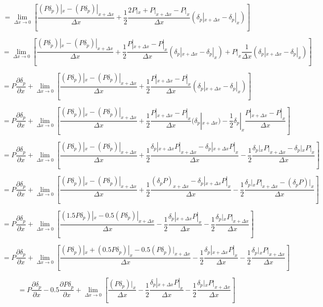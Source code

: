 \documentclass[11pt]{article}
\begin{document}
$$=\lim_{\Delta x \rightarrow 0} [\frac{(P \delta_p )|_x -  (P \delta_p )|_{x+\Delta x}}{\Delta x}  + \frac{1}{2} \frac{2P|_x + P|_{x+\Delta x} - P|_x}{\Delta x} (\delta_p|_{x+\Delta x} - \delta_p|_{x})] $$

$$=\lim_{\Delta x \rightarrow 0} [\frac{(P \delta_p )|_x -  (P \delta_p )|_{x+\Delta x}}{\Delta x}  + \frac{1}{2} \frac{ P|_{x+\Delta x} - P|_x}{\Delta x} (\delta_p|_{x+\Delta x} - \delta_p|_{x}) + P|_x \frac{1}{\Delta x} (\delta_p|_{x+\Delta x} - \delta_p|_{x})] $$


$$= P \frac{\partial \delta_p}{\partial x} + \lim_{\Delta x \rightarrow 0} [\frac{(P \delta_p )|_x -  (P \delta_p )|_{x+\Delta x}}{\Delta x}  + \frac{1}{2} \frac{ P|_{x+\Delta x} - P|_x}{\Delta x} (\delta_p|_{x+\Delta x} - \delta_p|_{x})] $$

$$= P \frac{\partial \delta_p}{\partial x} + \lim_{\Delta x \rightarrow 0} [\frac{(P \delta_p )|_x -  (P \delta_p )|_{x+\Delta x}}{\Delta x}  + \frac{1}{2} \frac{ P|_{x+\Delta x} - P|_x}{\Delta x} (\delta_p|_{x+\Delta x} ) - \frac{1}{2}\delta_p|_{x} \frac{ P|_{x+\Delta x} - P|_x }{\Delta x}  ] $$

$$= P \frac{\partial \delta_p}{\partial x} + \lim_{\Delta x \rightarrow 0} [\frac{(P \delta_p )|_x -  (P \delta_p )|_{x+\Delta x}}{\Delta x}  + \frac{1}{2} \frac{ \delta_p|_{x+\Delta x} P|_{x+\Delta x} - \delta_p|_{x+\Delta x} P|_x}{\Delta x} - \frac{1}{2} \frac{\delta_p|_{x} P|_{x+\Delta x} -\delta_p|_{x} P|_x }{\Delta x}  ] $$

$$= P \frac{\partial \delta_p}{\partial x} + \lim_{\Delta x \rightarrow 0} [\frac{(P \delta_p )|_x -  (P \delta_p )|_{x+\Delta x}}{\Delta x}  + \frac{1}{2} \frac{ (\delta_p P)_{x+\Delta x} - \delta_p|_{x+\Delta x} P|_x}{\Delta x} - \frac{1}{2} \frac{\delta_p|_{x} P|_{x+\Delta x} -(\delta_p P)|_x }{\Delta x}  ] $$

$$= P \frac{\partial \delta_p}{\partial x} + \lim_{\Delta x \rightarrow 0} [ \frac{( 1.5 P \delta_p )|_x -  0.5 (P \delta_p )|_{x+\Delta x}}{\Delta x}  - \frac{1}{2} \frac{ \delta_p|_{x+\Delta x} P|_x}{\Delta x} - \frac{1}{2} \frac{\delta_p|_{x} P|_{x+\Delta x}}{\Delta x}  ] $$

$$= P \frac{\partial \delta_p}{\partial x} + \lim_{\Delta x \rightarrow 0} [ \frac{(P \delta_p)|_x + (0.5 P \delta_p )|_x -  0.5 (P \delta_p )|_{x+\Delta x}}{\Delta x}  - \frac{1}{2} \frac{ \delta_p|_{x+\Delta x} P|_x}{\Delta x} - \frac{1}{2} \frac{\delta_p|_{x} P|_{x+\Delta x}}{\Delta x}  ] $$

$$= P \frac{\partial \delta_p}{\partial x} -0.5 \frac{\partial P\delta_p}{\partial x} + \lim_{\Delta x \rightarrow 0} [ \frac{(P \delta_p)|_x}{\Delta x}  - \frac{1}{2} \frac{ \delta_p|_{x+\Delta x} P|_x}{\Delta x} - \frac{1}{2} \frac{\delta_p|_{x} P|_{x+\Delta x}}{\Delta x}  ] $$
\end{document}
